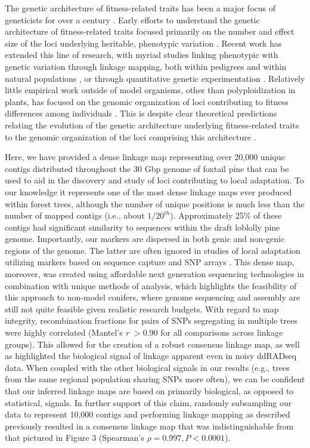\documentclass[smallextended]{svjour3}
\begin{document}
The genetic architecture of fitness-related traits has been a major focus of
geneticists for over a century \citep[reviewed by][]{Ellegren:2008}.  Early
efforts to understand the genetic architecture of fitness-related traits focused
primarily on the number and effect size of the loci underlying heritable,
phenotypic variation \citep{Fisher:1918}.  Recent work has extended this line of
research, with myriad studies linking phenotypic with genetic variation through
linkage mapping, both within pedigrees \citep{Mauricio:2001, Neale:2011,
  Ritland:2011} and within natural populations \citep{Ingvarsson:2011,
  Eckert:2013a}, or through quantitative genetic experimentation
\citep{Anderson:2013a, Anderson:2013b, Fournier-Level:2013}. Relatively little
empirical work outside of model organisms, other than polyploidization in
plants, has focused on the genomic organization of loci contributing to fitness
differences among individuals \citep[but see][]{Stevison:2011}. This is despite
clear theoretical predictions relating the evolution of the genetic architecture
underlying fitness-related traits to the genomic organization of the loci
comprising this architecture \citep{Kirkpatrick:2006, Yeaman:2011, Yeaman:2013,
  Akerman:2014}.

Here, we have provided a dense linkage map representing over 20,000 unique
contigs distributed throughout the 30 Gbp genome of foxtail pine that can be
used to aid in the discovery and study of loci contributing to local
adaptation. To our knowledge it represents one of the most dense linkage maps
ever produced within forest trees, although the number of unique positions is
much less than the number of mapped contigs (i.e., about
$1/20^{th}$). Approximately 25\% of these contigs had significant similarity to
sequences within the draft loblolly pine genome. Importantly, our markers are
dispersed in both genic and non-genic regions of the genome. The latter are
often ignored in studies of local adaptation utilizing markers based on sequence
capture \citep[e.g.,][]{Neves:2014} and SNP arrays
\citep[e.g.,][]{Eckert:2010a}. This dense map, moreover, was created using
affordable next generation sequencing technologies in combination with unique
methods of analysis, which highlights the feasibility of this approach to
non-model conifers, where genome sequencing and assembly are still not quite
feasible given realistic research budgets.  With regard to map integrity,
recombination fractions for pairs of SNPs segregating in multiple trees were
highly correlated (Mantel's \textit{r} $> 0.90$ for all comparisons across
linkage groups).  This allowed for the creation of a robust consensus linkage
map, as well as highlighted the biological signal of linkage apparent even in
noisy ddRADseq data. When coupled with the other biological signals in our
results (e.g., trees from the same regional population sharing SNPs more often),
we can be confident that our inferred linkage maps are based on primarily
biological, as opposed to statistical, signals. In further support of this
claim, randomly subsampling our data to represent 10,000 contigs and performing
linkage mapping as described previously resulted in a consensus linkage map that
was indistinguishable from that pictured in Figure $3$ (Spearman's $\rho =
0.997, P < 0.0001$).
\end{document}
